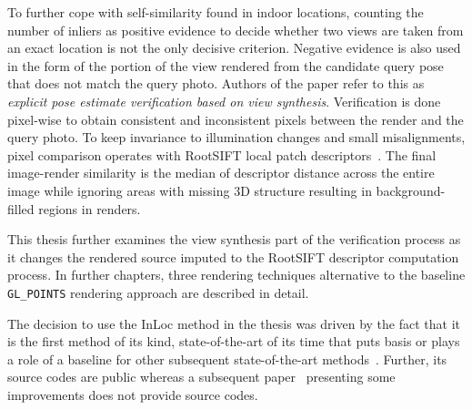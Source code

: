 To further cope with self-similarity found in indoor locations, counting the number of inliers
as positive evidence to decide whether two views are taken from an exact location is not the
only decisive criterion. Negative evidence is also used in the form of the portion of the view
rendered from the candidate query pose that does not match the query photo. Authors of the paper
refer to this as \emph{explicit pose estimate verification based on view synthesis}. Verification
is done pixel-wise to obtain consistent and inconsistent pixels between the render and the query photo.
To keep invariance to illumination changes and small misalignments, pixel comparison operates with RootSIFT
local patch descriptors~\citep{RootSIFT}. The final image-render similarity is the median of descriptor distance
across the entire image while ignoring areas with missing 3D structure resulting in background-filled regions in renders.

This thesis further examines the view synthesis part of the verification process as it changes the rendered source imputed
to the RootSIFT descriptor computation process. In further chapters, three rendering
techniques alternative to the baseline \verb|GL_POINTS| rendering approach are described in detail.

The decision to use the InLoc method in the thesis was driven by the fact that it is the first method of its kind,
state-of-the-art of its time that puts basis or plays a role of a baseline for
other subsequent state-of-the-art methods~\citep{PoseCorrection}. Further, its source codes are public whereas a subsequent paper~\citep{InLocRevisited}
presenting some improvements does not provide source codes.
